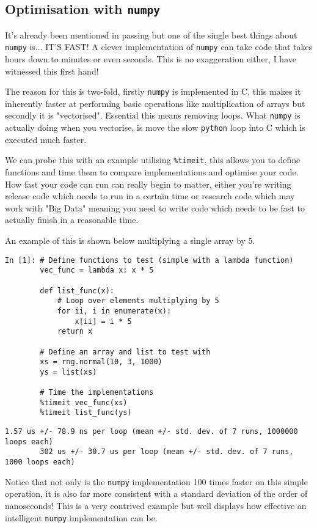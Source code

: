 \begin{tcolorbox}[colback=red!5!white,colframe=red!75!black]
\section{Optimisation with \texttt{numpy}}

It's already been mentioned in passing but one of the single best things about \texttt{numpy} is... IT'S FAST! A clever implementation of \texttt{numpy} can take code that takes hours down to minutes or even seconds. This is no exaggeration either, I have witnessed this first hand! 

The reason for this is two-fold, firstly \texttt{numpy} is implemented in C, this makes it inherently faster at performing basic operations like multiplication of arrays but secondly it is "vectorised". Essential this means removing loops. What \texttt{numpy} is actually doing when you vectorise, is move the slow \texttt{python} loop into C which is executed much faster.

We can probe this with an example utilising \texttt{\%timeit}, this allows you to define functions and time them to compare implementations and optimise your code. How fast your code can run can really begin to matter, either you're writing release code which needs to run in a certain time or research code which may work with "Big Data" meaning you need to write code which needs to be fast to actually finish in a reasonable time.

An example of this is shown below multiplying a single array by 5.

\begin{lstlisting}[style=PY]
In [1]: # Define functions to test (simple with a lambda function)
        vec_func = lambda x: x * 5
        
        def list_func(x):
            # Loop over elements multiplying by 5
            for ii, i in enumerate(x):
                x[ii] = i * 5
            return x
        
        # Define an array and list to test with
        xs = rng.normal(10, 3, 1000)
        ys = list(xs)
        
        # Time the implementations
        %timeit vec_func(xs)
        %timeit list_func(ys)
\end{lstlisting}
\begin{lstlisting}[style=PY, backgroundcolor=\color{white}]
        1.57 us +/- 78.9 ns per loop (mean +/- std. dev. of 7 runs, 1000000 loops each)
        302 us +/- 30.7 us per loop (mean +/- std. dev. of 7 runs, 1000 loops each)
\end{lstlisting}

Notice that not only is the \texttt{numpy} implementation 100 times faster on this simple operation, it is also far more consistent with a standard deviation of the order of nanoseconds! This is a very contrived example but well displays how effective an intelligent \texttt{numpy} implementation can be.

\end{tcolorbox}

